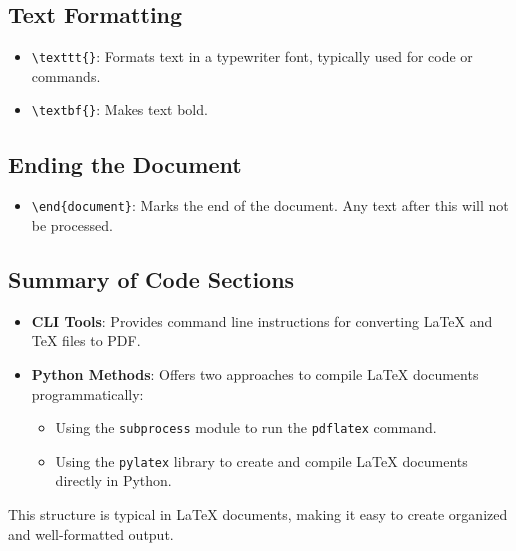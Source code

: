 \documentclass{article}
\begin{document}
\subsection*{Text Formatting}
\begin{itemize}
    \item \texttt{\textbackslash texttt\{\}}: Formats text in a typewriter font, typically used for code or commands.
    \item \texttt{\textbackslash textbf\{\}}: Makes text bold.
\end{itemize}

\subsection*{Ending the Document}
\begin{itemize}
    \item \texttt{\textbackslash end\{document\}}: Marks the end of the document. Any text after this will not be processed.
\end{itemize}

\subsection*{Summary of Code Sections}
\begin{itemize}
    \item \textbf{CLI Tools}: Provides command line instructions for converting LaTeX and TeX files to PDF.
    \item \textbf{Python Methods}: Offers two approaches to compile LaTeX documents programmatically:
    \begin{itemize}
        \item Using the \texttt{subprocess} module to run the \texttt{pdflatex} command.
        \item Using the \texttt{pylatex} library to create and compile LaTeX documents directly in Python.
    \end{itemize}
\end{itemize}

This structure is typical in LaTeX documents, making it easy to create organized and well-formatted output.
\end{document}
